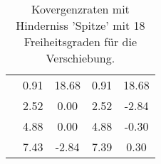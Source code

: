 \begin{table}
\begin{tabular}{c|cc|cc|}
\multicolumn{1}{|c|}{} & \multicolumn{1}{|c|}{      0.91} & \multicolumn{1}{|c|}{     18.68} & \multicolumn{1}{|c|}{      0.91} & \multicolumn{1}{|c|}{     18.68} \\ 
\multicolumn{1}{|c|}{} & \multicolumn{1}{|c|}{      2.52} & \multicolumn{1}{|c|}{      0.00} & \multicolumn{1}{|c|}{      2.52} & \multicolumn{1}{|c|}{     -2.84} \\ 
\multicolumn{1}{|c|}{} & \multicolumn{1}{|c|}{      4.88} & \multicolumn{1}{|c|}{      0.00} & \multicolumn{1}{|c|}{      4.88} & \multicolumn{1}{|c|}{     -0.30} \\ 
\multicolumn{1}{|c|}{} & \multicolumn{1}{|c|}{      7.43} & \multicolumn{1}{|c|}{     -2.84} & \multicolumn{1}{|c|}{      7.39} & \multicolumn{1}{|c|}{      0.30} \\ 
\hline 
\end{tabular}\caption{Kovergenzraten mit Hinderniss 'Spitze' mit 18 Freiheitsgraden für die Verschiebung.}\label{tab:Rate_Spitze_level0}
\end{table} 
